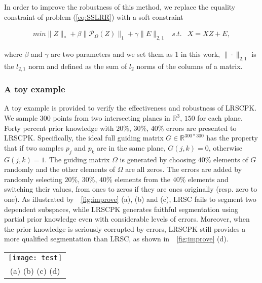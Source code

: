 %
In order to improve the robustness of this method, we replace the equality constraint of problem (\ref{eq:SSLRR}) with a soft constraint
\begin{small}
\begin{eqnarray}
min \|Z\|_{*} + \beta\|\mathcal {P}_{\Omega}(Z)\|_{1} +
\gamma\|E\|_{2,1} & s.t. & X=XZ+E, \label{eq:RSSLRR}
\end{eqnarray}
\end{small}
where $\beta$ and $\gamma$ are two parameters and we set them as 1 in this work, $\|\cdot\|_{2,1}$ is the $l_{2,1}$ norm and defined as the sum of $l_{2}$ norms of the columns of a matrix.

\subsubsection{A toy example}
\label{sec:toy}
A toy example is provided to verify the effectiveness and robustness of LRSCPK.
We sample $300$ points from two intersecting planes in $\mathbb{R}^{3}$, $150$ for
each plane.
%
Forty percent prior knowledge with $20\%$, $30\%$, $40\%$ errors are presented to LRSCPK.
%
Specifically, the ideal full guiding matrix $G\in \mathbb{R}^{300*300}$ has the property
that if two samples $p_{j}$ and $p_{k}$ are in the same plane, $G(j,k) = 0$,
otherwise $G(j,k) = 1$.
%
The guiding matrix $\Omega$ is generated by choosing $40\%$ elements of $G$ randomly and the other elements of $\Omega$ are all zeros. The errors are added by randomly selecting $20\%$, $30\%$, $40\%$ elements from the $40\%$ elements and switching their values, \ie from ones to zeros if they are ones originally (resp. zero to one).
%
As illustrated by~\fig~\ref{fig:improve} (a), (b) and (c), LRSC fails to segment two dependent subspaces, while LRSCPK generates faithful segmentation using partial prior knowledge even with considerable levels of errors.
Moreover, when the prior knowledge is seriously corrupted by errors, LRSCPK still provides a more qualified segmentation than LRSC, as shown in~\fig~\ref{fig:improve} (d).
\begin{figure*}[htbp]
\begin{center}
    \begin{tabular}{c}
        \texttt{[image: test]}\\
        \hspace{-10 mm} (a) \hspace{34 mm} (b) \hspace{34 mm} (c)\hspace{34 mm} (d)
    \end{tabular}
    \caption{Segmentation results of LRR and LRSCPK on two intersecting planes. (a) The result of LRR with $11\%$ clustering error. From (b) to (d) are the results of LRSCPK with $40\%$ prior knowledge which are corrupted by $20\%$, $30\%$ and $40\%$ errors, respectively. The clustering error is 0, 0 and $1\%$.}
    \label{fig:improve}
\end{center}
\end{figure*}
